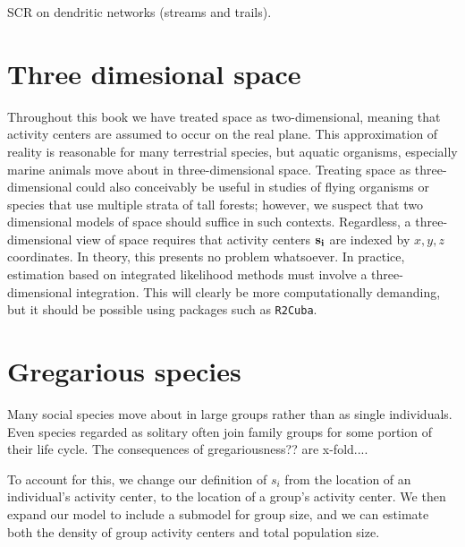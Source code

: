 SCR on dendritic networks (streams and trails).


\section{Three dimesional space}

Throughout this book we have treated space as
two-dimensional, meaning that activity centers are assumed to occur on
the real plane. This approximation of reality is reasonable for many
terrestrial species, but aquatic organisms, especially marine animals
move about in three-dimensional space. Treating space as
three-dimensional could also conceivably be useful in studies of flying organisms
or species that use multiple strata of tall forests; however, we
suspect that two dimensional models of space should suffice in such
contexts. Regardless, a three-dimensional view of space requires that
activity centers $\bf s_i$ are indexed by
$x,y,z$ coordinates. In theory, this presents no problem whatsoever. In
practice, estimation based on integrated likelihood methods must
involve a three-dimensional integration. This will clearly be more
computationally demanding, but it should be possible using packages
such as {\tt R2Cuba}.




\section{Gregarious species}

Many social species move about in large groups rather than as single
individuals. Even species regarded as solitary often join family
groups for some portion of their life cycle. The consequences of
gregariousness?? are x-fold....

To account for this, we change our definition of $s_i$ from the
location of an individual's activity center, to the location of a
group's activity center. We then expand our model to include a
submodel for group size, and we can estimate both the density of group
activity centers and total population size.






